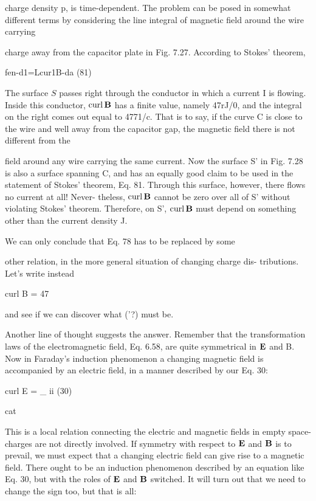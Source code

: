 charge density p, is time-dependent.
The problem can be posed in somewhat different terms by considering
the line integral of magnetic field around the wire carrying

charge away from the capacitor plate in Fig. 7.27. According to
Stokes' theorem,

\begin{equation}
\end{equation}
fen-d1=Lcur1B-da (81)

The surface $S$ passes right through the conductor in which a current
I is flowing. Inside this conductor, $\operatorname{curl}\mathbf{B}$ has a finite value,
namely 47rJ/0, and the integral on the right comes out equal to 4771/c.
That is to say, if the curve C is close to the wire and well away from
the capacitor gap, the magnetic field there is not different from the

field around any wire carrying the same current. Now the surface S'
in Fig. 7.28 is also a surface spanning C, and has an equally good
claim to be used in the statement of Stokes' theorem, Eq. 81.
Through this surface, however, there flows no current at all! Never-
theless, $\operatorname{curl}\mathbf{B}$ cannot be zero over all of S' without violating Stokes'
theorem. Therefore, on S', $\operatorname{curl}\mathbf{B}$ must depend on something other
than the current density J.

We can only conclude that Eq. 78 has to be replaced by some

other relation, in the more general situation of changing charge dis-
tributions. Let's write instead

\begin{equation}
\end{equation}
curl B = 47%

and see if we can discover what ('?) must be.

Another line of thought suggests the answer. Remember that the
transformation laws of the electromagnetic field, Eq. 6.58, are quite
symmetrical in $\mathbf{E}$ and B. Now in Faraday's induction phenomenon
a changing magnetic field is accompanied by an electric field, in a
manner described by our Eq. 30:

\begin{equation}
\end{equation}
curl E = _ ii (30)

cat

This is a local relation connecting the electric and magnetic fields in
empty space-charges are not directly involved. If symmetry with
respect to $\mathbf{E}$ and $\mathbf{B}$ is to prevail, we must expect that a changing electric
field can give rise to a magnetic field. There ought to be an induction
phenomenon described by an equation like Eq. 30, but with
the roles of $\mathbf{E}$ and $\mathbf{B}$ switched. It will turn out that we need to change
the sign too, but that is all:

